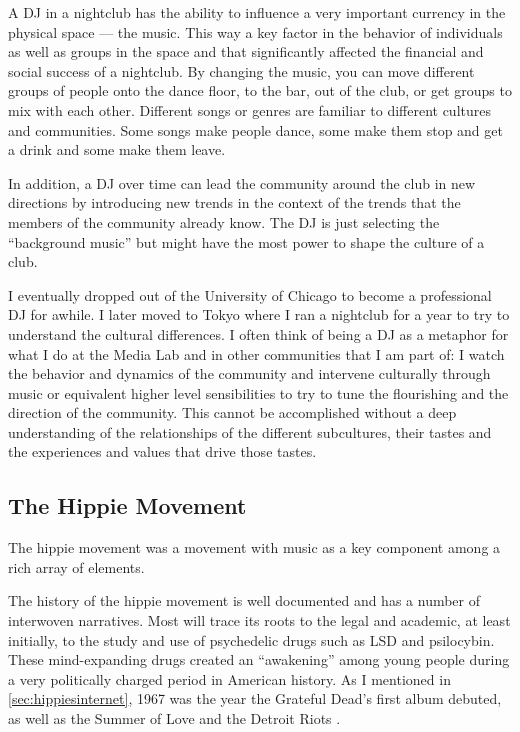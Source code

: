 A DJ in a nightclub has the ability to influence a very important currency in the physical space --- the music. This way a key factor in the behavior of individuals as well as groups in the space and that significantly affected the financial and social success of a nightclub. By changing the music, you can move different groups of people onto the dance floor, to the bar, out of the club, or get groups to mix with each other. Different songs or genres are familiar to different cultures and communities. Some songs make people dance, some make them stop and get a drink and some make them leave.

In addition, a DJ over time can lead the community around the club in new directions by introducing new trends in the context of the trends that the members of the community already know. The DJ is just selecting the ``background music'' but might have the most power to shape the culture of a club.

I eventually dropped out of the University of Chicago to become a professional DJ for awhile. I later moved to Tokyo where I ran a nightclub for a year to try to understand the cultural differences. I often think of being a DJ as a metaphor for what I do at the Media Lab and in other communities that I am part of: I watch the behavior and dynamics of the community and intervene culturally through music or equivalent higher level sensibilities to try to tune the flourishing and the direction of the community. This cannot be accomplished without a deep understanding of the relationships of the different subcultures, their tastes and the experiences and values that drive those tastes.



\subsection{The Hippie Movement}

The hippie movement was a movement with music as a key component among a rich array of elements.

The history of the hippie movement is well documented and has a number of interwoven narratives. Most will trace its roots to the legal and academic, at least initially, to the study and use of psychedelic drugs such as LSD and psilocybin. These mind-expanding drugs created an ``awakening'' among young people during a very politically charged period in American history. As I mentioned in \autoref{sec:hippiesinternet}, 1967 was the year the Grateful Dead's first album debuted, as well as the Summer of Love and the Detroit Riots .

